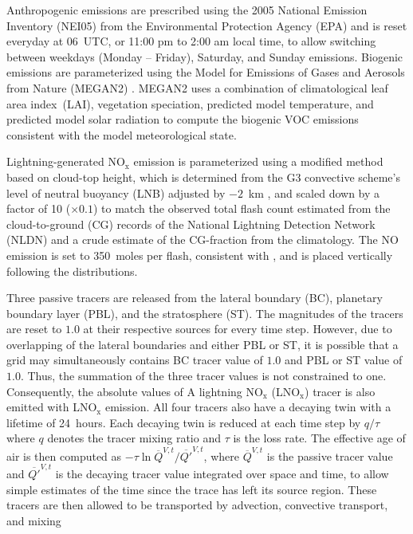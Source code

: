 Anthropogenic emissions are prescribed using the 2005 National Emission Inventory (NEI05) from the
Environmental Protection Agency (EPA) and is reset everyday at 06~UTC, or 11:00 pm to 2:00 am
local time, to allow switching between weekdays (Monday -- Friday), Saturday, and Sunday
emissions. Biogenic emissions are parameterized using the Model for Emissions of Gases and Aerosols
from Nature (MEGAN2) \citep{Guenther:2006kl}. MEGAN2 uses a combination of climatological leaf area
index~(LAI), vegetation speciation, predicted model temperature, and predicted model solar radiation
to compute the biogenic VOC emissions consistent with the model meteorological state.

Lightning-generated NO$_\mathrm{x}$ emission is parameterized using a modified \citet{Price:1992wb}
method based on cloud-top height, which is determined from the G3 convective scheme's level of neutral buoyancy 
(LNB) adjusted by $-2$~km \citep{Wong:2013vn}, and scaled down by a factor of 10 ($\times0.1$) to match the observed total
flash count estimated from the cloud-to-ground (CG) records of the National Lightning Detection
Network (NLDN) \citep{Cummins:2009aa} and a crude estimate of the CG-fraction from the
\citet{Boccippio:2001ys} climatology. The NO emission is set to 350~moles per flash, consistent
with \citet{Barth:2012qf}, and is placed vertically following the \citet{Ott:2010lo} distributions.

Three passive tracers are released from the lateral boundary (BC), planetary boundary layer (PBL), and
the stratosphere (ST). The magnitudes of the tracers are reset to $1.0$ at their respective sources for every
time step. However, due to overlapping of the lateral boundaries and either PBL or ST, it is possible that
a grid may simultaneously contains BC tracer value of $1.0$ and PBL or ST value of $1.0$. Thus, the
summation of the three tracer values is not constrained to one. Consequently, the absolute values of
A lightning NO$_\mathrm{x}$ (LNO$_\mathrm{x}$) tracer is also emitted with
LNO$_\mathrm{x}$ emission. All four tracers also have a decaying twin with a lifetime of 24~hours.
Each decaying twin is reduced at each time step by $q/\tau$ where $q$ denotes the tracer mixing ratio
and $\tau$ is the loss rate. The effective age of air is then computed as $-\tau\ln\overline{Q}^{V,t}/\overline{Q'}^{V,t}$,
where $\overline{Q}^{V,t}$ is the passive tracer value and $\overline{Q'}^{V,t}$ is the decaying tracer value
integrated over space and time, to allow simple estimates of the time since the trace has left its source region.
These tracers are then allowed to be transported by advection, convective transport, and mixing 

